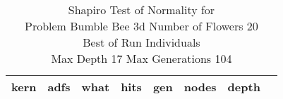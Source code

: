 \begin{table}[H]
\caption{Shapiro Test of Normality for \\ Problem  Bumble Bee 3d  Number of Flowers 20\\Best of Run Individuals \\ Max Depth 17 Max Generations 104\\}
\begin{center}
\scalebox{0.8} %
{
\begin{tabular}{lrrrrrrr}
\hline
kern & adfs & what & hits & gen & nodes & depth \\
\hline


\end{tabular}
}
\end{center}
\end{table}

